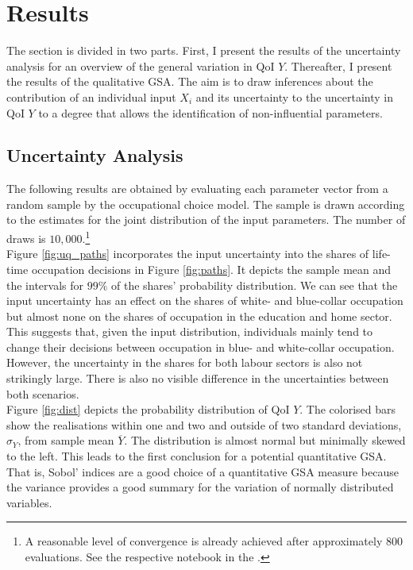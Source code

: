 \section{Results}

The section is divided in two parts. First, I present the results of the uncertainty analysis for an overview of the general variation in QoI $Y$. Thereafter, I present the results of the qualitative GSA. The aim is to draw inferences about the contribution of an individual input $X_i$ and its uncertainty to the uncertainty in QoI $Y$ to a degree that allows the identification of non-influential parameters.

\subsection{Uncertainty Analysis}
The following results are obtained by evaluating each parameter vector from a random sample by the occupational choice model. The sample is drawn according to the estimates for the joint distribution of the input parameters. The number of draws is $10,000$.\footnote{A reasonable level of convergence is already achieved after approximately 800 evaluations. See the respective notebook in the .}\\

\noindent
Figure \ref{fig:uq_paths} incorporates the input uncertainty into the shares of life-time occupation decisions in Figure \ref{fig:paths}. It depicts the sample mean and the intervals for $99\%$ of the shares' probability distribution. We can see that the input uncertainty has an effect on the shares of white- and blue-collar occupation but almost none on the shares of occupation in the education and home sector. This suggests that, given the input distribution, individuals mainly tend to change their decisions between occupation in blue- and white-collar occupation. However, the uncertainty in the shares for both labour sectors is also not strikingly large. There is also no visible difference in the uncertainties between both scenarios.\\


\noindent
Figure \ref{fig:dist} depicts the probability distribution of QoI $Y$. The colorised bars show the realisations within one and two and outside of two standard deviations, $\sigma_Y$, from sample mean $\overline{Y}$.  The distribution is almost normal but minimally skewed to the left. This leads to the first conclusion for a potential quantitative GSA. That is, Sobol' indices are a good choice of a quantitative GSA measure because the variance provides a good summary for the variation of normally distributed variables.\\


